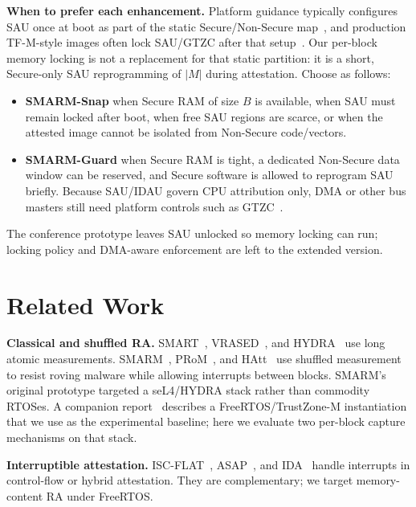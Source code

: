 \documentclass[conference]{IEEEtran}
\newcommand{\smarmcopy}{SMARM-Snap\xspace}
\newcommand{\smarmlock}{SMARM-Guard\xspace}
\begin{document}
\textbf{When to prefer each enhancement.}
Platform guidance typically configures SAU once at boot as part of the
static Secure/Non-Secure map~\cite{armv8m-arm,an5347,cmsis-tz,tfm-isolation},
and production TF-M-style images often lock SAU/GTZC after that
setup~\cite{um2851,tfm2024}.
Our per-block memory locking is not a replacement for that static
partition: it is a short, Secure-only SAU reprogramming of $|M|$ during
attestation.
Choose as follows:

\begin{itemize}
  \item \textbf{\smarmcopy} when Secure RAM of size $B$ is available,
    when SAU must remain locked after boot, when free SAU regions are
    scarce, or when the attested image cannot be isolated from Non-Secure
    code/vectors.
  \item \textbf{\smarmlock} when Secure RAM is tight, a dedicated
    Non-Secure data window can be reserved, and Secure software is
    allowed to reprogram SAU briefly. Because SAU/IDAU govern CPU
    attribution only, DMA or other bus masters still need platform
    controls such as GTZC~\cite{an5347}.
\end{itemize}
The conference prototype leaves SAU unlocked so memory locking can
run; locking policy and DMA-aware enforcement are left to the
extended version.

\section{Related Work}
\label{sec:related}

\textbf{Classical and shuffled RA.}
SMART~\cite{eldefrawy2012smart}, VRASED~\cite{nunes2019vrased}, and
HYDRA~\cite{eldefrawy2017hydra} use long atomic measurements.
SMARM~\cite{carpent2018smarm}, PRoM~\cite{aman2021prom}, and
HAtt~\cite{aman2018hatt} use shuffled measurement to resist roving
malware while allowing interrupts between blocks. SMARM's original
prototype targeted a seL4/HYDRA stack rather than commodity RTOSes.
A companion report~\cite{smarmplus2026} describes a FreeRTOS/TrustZone-M
instantiation that we use as the experimental baseline; here we evaluate
two per-block capture mechanisms on that stack.

\textbf{Interruptible attestation.}
ISC-FLAT~\cite{isc-flat}, ASAP~\cite{asap}, and IDA~\cite{ida2024}
handle interrupts in control-flow or hybrid attestation. They are
complementary; we target memory-content RA under FreeRTOS.
\end{document}
